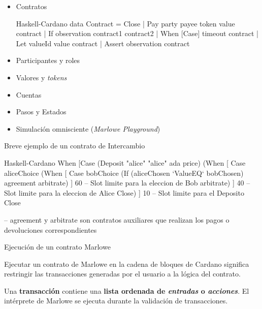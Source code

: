 \documentclass{beamer}
\newcommand{\nologo}{\setbeamertemplate{logo}{}} %
\begin{document}
{\nologo
\begin{frame}[fragile]
\begin{itemize}
    \item Contratos
        \pause

\begin{code}{Haskell-Cardano}
data Contract = Close
              | Pay party payee token value contract
              | If observation contract1 contract2
              | When [Case] timeout contract
              | Let valueId value contract
              | Assert observation contract
\end{code}
        \pause
    \item Participantes y roles
        \pause
    \item Valores y \textit{tokens}
        \pause
    \item Cuentas
        \pause
    \item Pasos y Estados
        \pause
    \item Simulación omnisciente (\textit{Marlowe Playground})

\end{itemize}
\end{frame}
}

{\nologo
\begin{frame}[fragile]{Breve ejemplo de un contrato de Intercambio}
\begin{code}{Haskell-Cardano}
When [Case (Deposit "alice" "alice" ada price)   
        (When [ Case aliceChoice
                  (When [ Case bobChoice
                            (If (aliceChosen `ValueEQ` bobChosen)
                                 agreement
                                 arbitrate) 
                        ]
                        60 -- Slot limite para la eleccion de Bob
                        arbitrate)
              ]
              40  -- Slot limite para la eleccion de Alice
              Close)
     ]
     10   -- Slot limite para el Deposito
     Close    

-- agreement y arbitrate son contratos auxiliares que realizan los pagos o devoluciones correspondientes
\end{code}

\end{frame}
}

\begin{frame}{Ejecución de un contrato Marlowe}

Ejecutar un contrato de Marlowe en la cadena de bloques de Cardano significa restringir las transacciones generadas por el usuario a la lógica del contrato.
\vfill
\pause

Una \textbf{transacción} contiene una \textbf{lista ordenada de \textit{entradas} o \textit{acciones}}. El intérprete de Marlowe se ejecuta durante la validación de transacciones. 

\end{frame}
\end{document}

